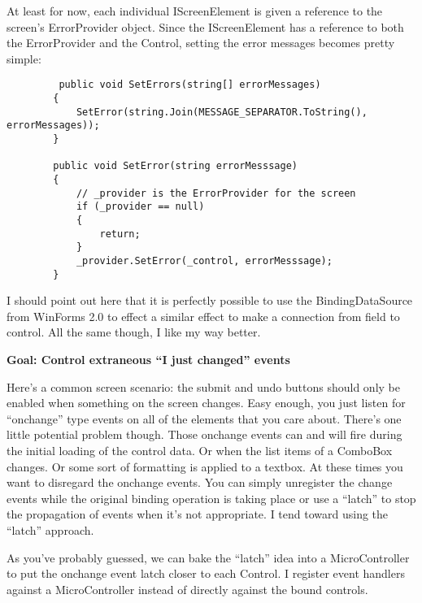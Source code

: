 \documentclass{article}
\begin{document}
{At least for now, each individual IScreenElement is given a reference to the screen's ErrorProvider object.  Since the IScreenElement has a reference to both the ErrorProvider and the Control, setting the error messages becomes pretty simple:
\begin{lstlisting}
         public void SetErrors(string[] errorMessages)
        {
            SetError(string.Join(MESSAGE_SEPARATOR.ToString(), errorMessages));
        }

        public void SetError(string errorMesssage)
        {
            // _provider is the ErrorProvider for the screen
            if (_provider == null)
            {
                return;
            }
            _provider.SetError(_control, errorMesssage);
        }
\end{lstlisting}

I should point out here that it is perfectly possible to use the BindingDataSource from WinForms 2.0 to effect a similar effect to make a connection from field to control.  All the same though, I like my way better.

\Large {\textbf{Goal:  Control extraneous “I just changed” events}}

Here's a common screen scenario:  the submit and undo buttons should only be enabled when something on the screen changes.  Easy enough, you just listen for “onchange” type events on all of the elements that you care about.  There's one little potential problem though.  Those onchange events can and will fire during the initial loading of the control data.  Or when the list items of a ComboBox changes.  Or some sort of formatting is applied to a textbox.  At these times you want to disregard the onchange events.  You can simply unregister the change events while the original binding operation is taking place or use a “latch” to stop the propagation of events when it's not appropriate.  I tend toward using the “latch” approach. 

As you've probably guessed, we can bake the “latch” idea into a MicroController to put the onchange event latch closer to each Control.  I register event handlers against a MicroController instead of directly against the bound controls. 

}
\end{document}
